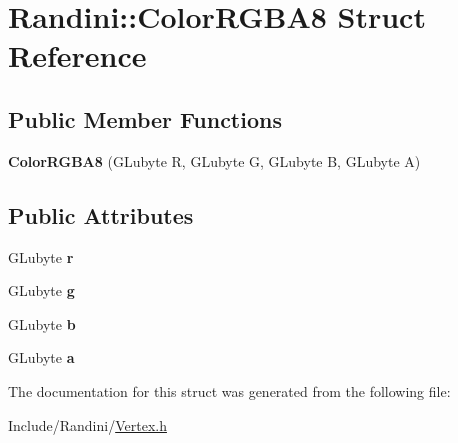 \hypertarget{structRandini_1_1ColorRGBA8}{
\section{Randini::ColorRGBA8 Struct Reference}
\label{structRandini_1_1ColorRGBA8}
}
\subsection*{Public Member Functions}
\begin{DoxyCompactItemize}
\item 
\hypertarget{structRandini_1_1ColorRGBA8_a396717be022d8a9aedaebcce68380c55}{
{\bfseries ColorRGBA8} (GLubyte R, GLubyte G, GLubyte B, GLubyte A)}
\label{structRandini_1_1ColorRGBA8_a396717be022d8a9aedaebcce68380c55}

\end{DoxyCompactItemize}
\subsection*{Public Attributes}
\begin{DoxyCompactItemize}
\item 
\hypertarget{structRandini_1_1ColorRGBA8_a699de73c4f40c7acc194e192adbc3f3c}{
GLubyte {\bfseries r}}
\label{structRandini_1_1ColorRGBA8_a699de73c4f40c7acc194e192adbc3f3c}

\item 
\hypertarget{structRandini_1_1ColorRGBA8_abaacd81b0deea181df45daf4f0a2ebf5}{
GLubyte {\bfseries g}}
\label{structRandini_1_1ColorRGBA8_abaacd81b0deea181df45daf4f0a2ebf5}

\item 
\hypertarget{structRandini_1_1ColorRGBA8_af84fd1ca49952f1d59d03f658d7b2ba5}{
GLubyte {\bfseries b}}
\label{structRandini_1_1ColorRGBA8_af84fd1ca49952f1d59d03f658d7b2ba5}

\item 
\hypertarget{structRandini_1_1ColorRGBA8_a0eed6101efaa81166984a78c08b02ed4}{
GLubyte {\bfseries a}}
\label{structRandini_1_1ColorRGBA8_a0eed6101efaa81166984a78c08b02ed4}

\end{DoxyCompactItemize}


The documentation for this struct was generated from the following file:\begin{DoxyCompactItemize}
\item 
Include/Randini/\hyperlink{Vertex_8h}{Vertex.h}\end{DoxyCompactItemize}
